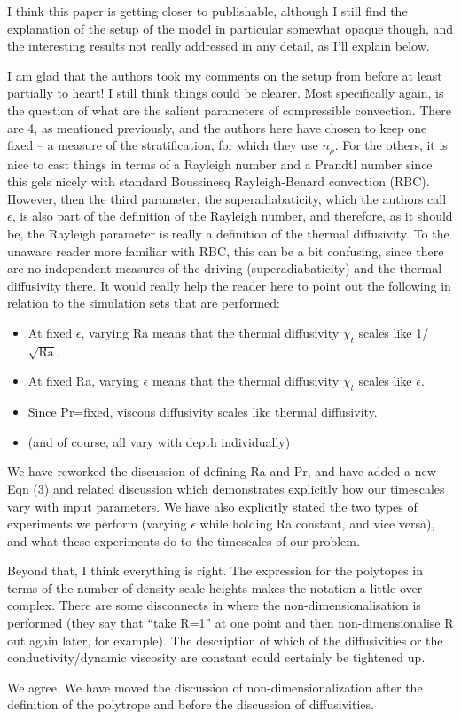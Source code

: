 \documentclass[aps, 11pt, singlecolumn]{revtex4-1} %
\begin{document}
\begin{singlespace}
\begin{myquotation}
I think this paper is getting closer to publishable, although I still
find the explanation of the setup of the model in particular somewhat
opaque though, and the interesting results not really addressed in any
detail, as I'll explain below.

I am glad that the authors took my comments on the setup from before
at least partially to heart! I still think things could be clearer.
Most specifically again, is the question of what are the salient
parameters of compressible convection. There are 4, as mentioned
previously, and the authors here have chosen to keep one fixed -- a
measure of the stratification, for which they use $n_\rho$. For the
others, it is nice to cast things in terms of a Rayleigh number and a
Prandtl number since this gels nicely with standard Boussinesq
Rayleigh-Benard convection (RBC). However, then the third parameter,
the superadiabaticity, which the authors call $\epsilon$, is also part of
the definition of the Rayleigh number, and therefore, as it should be,
the Rayleigh parameter is really a definition of the thermal
diffusivity. To the unaware reader more familiar with RBC, this can be
a bit confusing, since there are no independent measures of the
driving (superadiabaticity) and the thermal diffusivity there. It
would really help the reader here to point out the following in
relation to the simulation sets that are performed:

\begin{itemize}
\item At fixed $\epsilon$, varying Ra means that the thermal diffusivity $\chi_t$
scales like 1/$\sqrt{\text{Ra}}$.
\item At fixed Ra, varying $\epsilon$ means that the thermal diffusivity $\chi_t$
scales like $\epsilon$.
\item Since Pr=fixed, viscous diffusivity scales like thermal diffusivity.
\item (and of course, all vary with depth individually)
\end{itemize}
\end{myquotation}
We have reworked the discussion of defining Ra and Pr, and have added
a new Eqn (3) and related discussion which demonstrates explicitly 
how our timescales vary with input parameters.  
We have also explicitly stated the two types
of experiments we perform (varying $\epsilon$ while holding Ra constant,
and vice versa), and what these experiments do to the timescales of
our problem.

\begin{myquotation}
Beyond that, I think everything is right. The expression for the
polytopes in terms of the number of density scale heights makes the
notation a little over-complex. There are some disconnects in where
the non-dimensionalisation is performed (they say that ``take R=1'' at
one point and then non-dimensionalise R out again later, for example).
The description of which of the diffusivities or the
conductivity/dynamic viscosity are constant could certainly be
tightened up.
\end{myquotation}
We agree. We have moved the discussion of non-dimensionalization after the
definition of the polytrope and before the discussion of diffusivities.



\end{singlespace}
\end{document}
